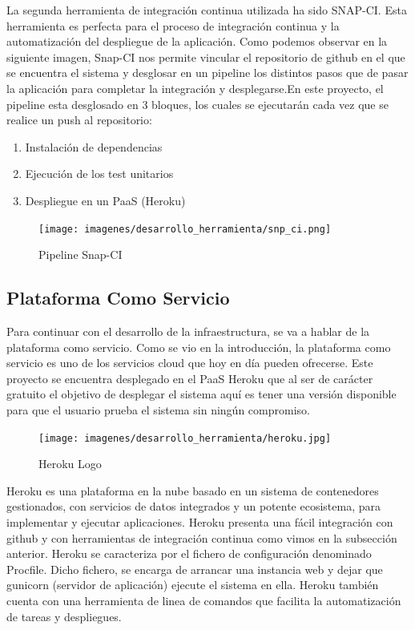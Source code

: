 \documentclass[a4paper,11pt]{book}
\begin{document}
La segunda herramienta de integración continua utilizada ha sido SNAP-CI\cite{snap}. Esta herramienta es perfecta para el proceso de integración continua y la automatización del despliegue de la aplicación. Como podemos observar en la siguiente imagen, Snap-CI nos permite vincular el repositorio de github en el que se encuentra el sistema y desglosar en un pipeline los distintos pasos que de pasar la aplicación para completar la integración y desplegarse.En este proyecto, el pipeline esta desglosado en 3 bloques, los cuales se ejecutarán cada vez que se realice un push al repositorio:

\begin{enumerate}
\item Instalación de dependencias
\item Ejecución de los test unitarios
\item Despliegue en un PaaS (Heroku)  
\end{enumerate}

\begin{figure}[H] 
\centering 
\texttt{[image: imagenes/desarrollo\_herramienta/snp\_ci.png]}
\caption{ Pipeline Snap-CI\cite{snapP}  }  
\end{figure}  	





\subsection{Plataforma Como Servicio}

Para continuar con el desarrollo de la infraestructura, se va a hablar de la plataforma como servicio. Como se vio en la introducción, la plataforma como servicio es uno de los servicios cloud que hoy en día pueden ofrecerse. Este proyecto se encuentra desplegado en el PaaS Heroku\cite{hero} que al ser de carácter gratuito el objetivo de desplegar el sistema aquí es tener una versión disponible para que el usuario prueba el sistema sin ningún compromiso.

\begin{figure}[H] 
\centering 
\texttt{[image: imagenes/desarrollo\_herramienta/heroku.jpg]}
\caption{ Heroku Logo\cite{heroL}  }  
\end{figure}  	
 

Heroku es una plataforma en la nube basado en un sistema de contenedores gestionados, con servicios de datos integrados y un potente ecosistema, para implementar y ejecutar aplicaciones. Heroku presenta una fácil integración con github y con herramientas de integración continua como vimos en la subsección anterior. Heroku se caracteriza por el fichero de configuración denominado Procfile. Dicho fichero, se encarga de arrancar una instancia web y dejar que gunicorn (servidor de aplicación) ejecute el sistema en ella. Heroku también cuenta con una herramienta de linea de comandos que facilita la automatización de tareas y despliegues. 
\end{document}
